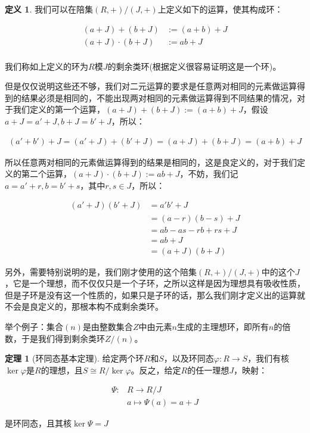 \documentclass[12pt, a4paper, oneside]{ctexart}
\theoremstyle{definition}
\newtheorem*{definition}{定义}
\newtheorem*{theorem}{定理}
\begin{document}
\begin{definition}
我们可以在陪集$(R,+)/(J,+)$上定义如下的运算，使其构成环：

\begin{align*}
(a+J)+(b+J)&:=(a+b)+J\\
(a+J)\cdot(b+J)&:=ab+J\\
\end{align*}

我们称如上定义的环为$R$模$J$的剩余类环(根据定义很容易证明这是一个环)。
\end{definition}

但是仅仅说明这些还不够，我们对二元运算的要求是任意两对相同的元素做运算得到的结果必须是相同的，不能出现两对相同的元素做运算得到不同结果的情况，对于我们定义的第一个运算，$(a+J)+(b+J):=(a+b)+J$，假设$a+J=a'+J,b+J=b'+J$，所以：

\begin{align*}
(a'+b')+J=(a'+J)+(b'+J)=(a+J)+(b+J)=(a+b)+J
\end{align*}

所以任意两对相同的元素做运算得到的结果是相同的，这是良定义的，对于我们定义的第二个运算，$(a+J)\cdot(b+J):=ab+J$，不妨，我们记$a=a'+r,b=b'+s$，其中$r,s\in J$，所以：

\begin{align*}
(a'+J)(b'+J)&=a'b'+J\\
&=(a-r)(b-s)+J\\
&=ab-as-rb+rs+J\\
&=ab+J\\
&=(a+J)(b+J)
\end{align*}

另外，需要特别说明的是，我们刚才使用的这个陪集$(R,+)/(J,+)$中的这个$J$，它是一个理想，而不仅仅只是一个子环，之所以这样是因为理想具有吸收性质，但是子环是没有这一个性质的，如果只是子环的话，那么我们刚才定义出的运算就不会是良定义的，那根本构不成剩余类环。

举个例子：集合$(n)$是由整数集合$Z$中由元素$n$生成的主理想环，即所有$n$的倍数，于是我们得到剩余类环$Z/(n)$。

\begin{theorem}[环同态基本定理]
给定两个环$R$和$S$，以及环同态$\varphi:R\rightarrow S$，我们有核$\ker\varphi$是$R$的理想，且$S\cong R/\ker\varphi$。反之，给定$R$的任一理想$J$，映射：

\begin{align*}
\Psi : & R\rightarrow R/J\\
&a\mapsto \Psi(a)=a+J
\end{align*}

是环同态，且其核$\ker\Psi=J$
\end{theorem}
\end{document}

